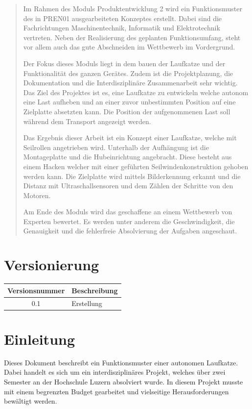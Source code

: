 \documentclass[a4paper]{report}
\begin{document}
\begin{abstract}
	Im Rahmen des Moduls Produktentwicklung 2 wird ein Funktionsmuster des in PREN01 ausgearbeiteten Konzeptes erstellt. Dabei sind die Fachrichtungen Maschinentechnik, Informatik und Elektrotechnik vertreten. Neben der Realisierung des geplanten Funktionsumfang, steht vor allem auch das gute Abschneiden im Wettbewerb im Vordergrund.
	
	Der Fokus dieses Moduls liegt in dem bauen der Laufkatze und der Funktionalität des ganzen Gerätes. Zudem ist die Projektplanung, die Dokumentation und die Interdisziplinäre Zusammenarbeit sehr wichtig. Das Ziel des Projektes ist es, eine Laufkatze zu entwickeln welche autonom eine Last aufheben und an einer zuvor unbestimmten Position auf eine Zielplatte absetzten kann. Die Position der aufgenommenen Last soll während dem Transport angezeigt werden.
	
	Das Ergebnis dieser Arbeit ist ein Konzept einer Laufkatze, welche mit Seilrollen angetrieben wird. Unterhalb der Aufhängung ist die Montageplatte und die Hubeinrichtung angebracht. Diese besteht aus einem Hacken welcher mit einer geführten Seilwindenkonstruktion gehoben werden kann. Die Zielplatte wird mittels Bilderkennung erkannt und die Distanz mit Ultraschallsensoren und dem Zählen der Schritte von den Motoren.
	
	Am Ende des Moduls wird das geschaffene an einem Wettbewerb von Experten bewertet. Es werden unter anderem die Geschwindigkeit, die Genauigkeit und die fehlerfreie Absolvierung der Aufgaben angeschaut. 
	
\end{abstract}

\chapter*{Versionierung}
\label{ch*:Vers}
\vspace{2em}

\noindent
\begin{tabular}{|c|p{}|}
	\hline
	\textbf{Versionsnummer} & \textbf{Beschreibung}\\
	\hline
	0.1 & Erstellung \\
	\hline
\end{tabular}

\tableofcontents

\newpage


\chapter{Einleitung}
\label{ch:Intro}
Dieses Dokument beschreibt ein Funktionsmuster einer autonomen Laufkatze. Dabei handelt es sich um ein interdisziplinäres Projekt, welches über zwei Semester an der Hochschule Luzern absolviert wurde. In diesem Projekt musste mit einem begrenzten Budget gearbeitet und vielseitige Herausforderungen bewältigt werden.
\end{document}
